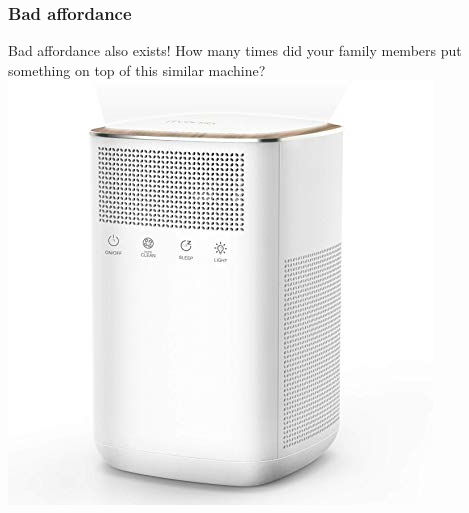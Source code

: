 \documentclass{beamer}
\begin{document}
\begin{frame}
\frametitle{Bad affordance}
\centering
Bad affordance also exists!  How many times did your family members put something on top of this similar machine?
\includegraphics[width=0.5\linewidth]{badaffordance1}
\end{frame}
%
%
\end{document}
